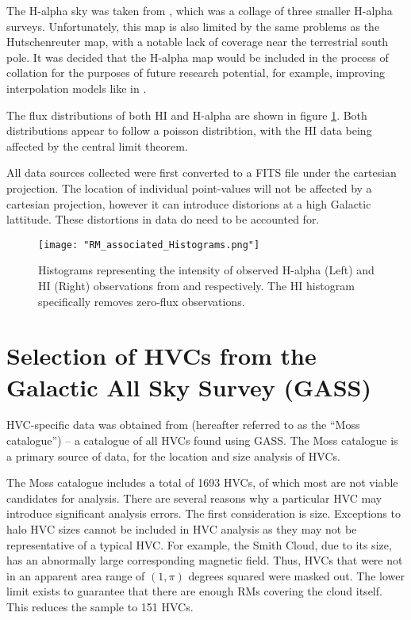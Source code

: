 The H-alpha sky was taken from \cite{ID43}, which was a collage of three smaller H-alpha surveys. Unfortunately, this map is also limited by the same problems as the Hutschenreuter map, with a notable lack of coverage near the terrestrial south pole. It was decided that the H-alpha map would be included in the process of collation for the purposes of future research potential, for example, improving interpolation models like in \cite{ID45, ID44}.


The flux distributions of both HI and H-alpha are shown in figure \ref{fig:h1_ha}. Both distributions appear to follow a poisson distribtion, with the HI data being affected by the central limit theorem.


All data sources collected were first converted to a FITS file under the cartesian projection. The location of individual point-values will not be affected by a cartesian projection, however it can introduce distorions at a high Galactic lattitude. These distortions in data do need to be accounted for.

\begin{figure}
    \texttt{[image: "RM\_associated\_Histograms.png"]}
    \centering
    \caption{Histograms representing the intensity of observed H-alpha (Left) and HI (Right) observations from \cite{ID42} and \cite{ID6} respectively. The HI histogram specifically removes zero-flux observations.}
    \label{fig:h1_ha}
\end{figure}

\section{Selection of HVCs from the Galactic All Sky Survey (GASS)}
\label{sec:hvc_sel}

HVC-specific data was obtained from \cite{ID3} (hereafter referred to as the “Moss catalogue”) – a catalogue of all HVCs found using GASS. The Moss catalogue is a primary source of data, for the location and size analysis of HVCs.


The Moss catalogue includes a total of 1693 HVCs, of which most are not viable candidates for analysis. There are several reasons why a particular HVC may introduce significant analysis errors. The first consideration is size. Exceptions to halo HVC sizes cannot be included in HVC analysis as they may not be representative of a typical HVC. For example, the Smith Cloud, due to its size, has an abnormally large corresponding magnetic field. Thus, HVCs that were not in an apparent area range of $(1,\pi)$ degrees squared were masked out. The lower limit exists to guarantee that there are enough RMs covering the cloud itself. This reduces the sample to 151 HVCs.


